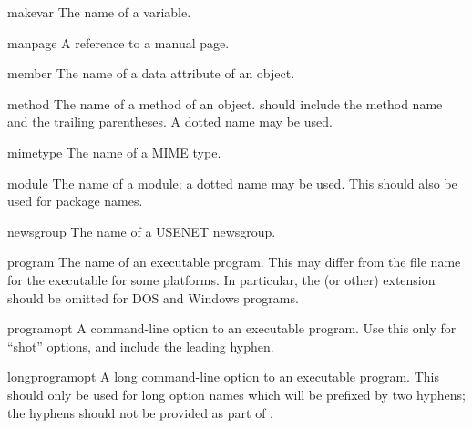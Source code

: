 \documentclass{howto}
\begin{document}
    \begin{macrodesc}{makevar}{}
      The name of a  variable.
    \end{macrodesc}

    \begin{macrodesc}{manpage}{}
      A reference to a \UNIX{} manual page.
    \end{macrodesc}

    \begin{macrodesc}{member}{}
      The name of a data attribute of an object.
    \end{macrodesc}

    \begin{macrodesc}{method}{}
      The name of a method of an object.   should include the
      method name and the trailing parentheses.  A dotted name may be
      used.
    \end{macrodesc}

    \begin{macrodesc}{mimetype}{}
      The name of a MIME type.
    \end{macrodesc}

    \begin{macrodesc}{module}{}
       The name of a module; a dotted name may be used.  This should
       also be used for package names.
    \end{macrodesc}

    \begin{macrodesc}{newsgroup}{}
      The name of a USENET newsgroup.
    \end{macrodesc}

    \begin{macrodesc}{program}{}
      The name of an executable program.  This may differ from the
      file name for the executable for some platforms.  In particular, 
      the  (or other) extension should be omitted for DOS
      and Windows programs.
    \end{macrodesc}

    \begin{macrodesc}{programopt}{}
      A command-line option to an executable program.  Use this only
      for ``shot'' options, and include the leading hyphen.
    \end{macrodesc}

    \begin{macrodesc}{longprogramopt}{}
      A long command-line option to an executable program.  This
      should only be used for long option names which will be prefixed
      by two hyphens; the hyphens should not be provided as part of
      .
    \end{macrodesc}
\end{document}
